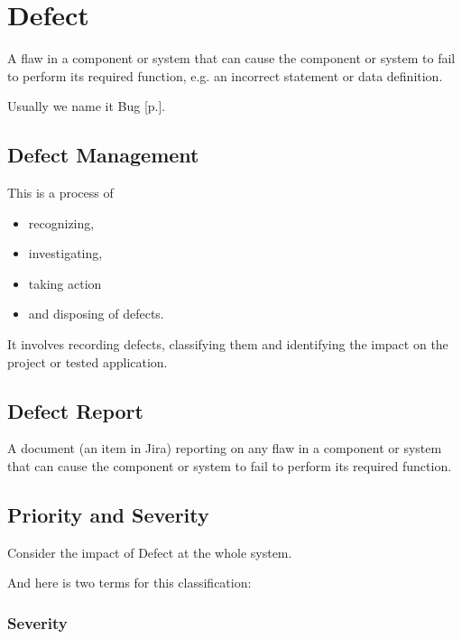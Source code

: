 \section{Defect}
\label{sec:Defect}

A flaw in a component or system that can cause the component or system to fail to perform its required function, e.g. an incorrect statement or data definition.

Usually we name it Bug [p.\pageref{sec:Bug}].

\subsection{Defect Management}
\label{sec:Defect Management}

This is a process of

\begin{itemize}
\item 
    recognizing,
\item 
investigating,
\item 
taking action
\item 
and disposing of defects. 
\end{itemize}

It involves recording defects, classifying them and identifying the impact on the project or tested application.

\subsection{Defect Report}
\label{sec:Defect Report}

A document (an item in Jira) reporting on any flaw in a component or system that can cause the component or system to fail to perform its required function.

\subsection{Priority and Severity}
\label{sec:Priority and Severity}

Consider the impact of Defect at the whole system. 

And here is two terms for this classification: 

\subsubsection{Severity}
\label{sec:Severity}

